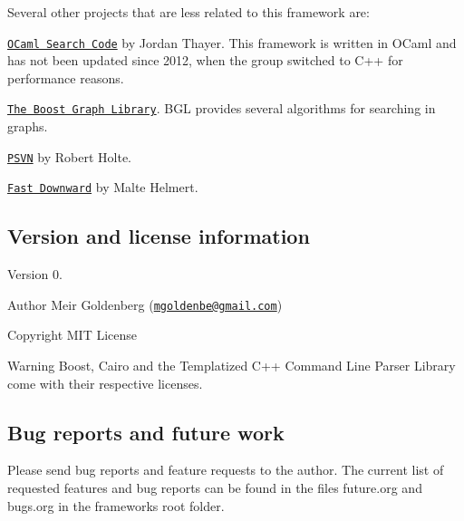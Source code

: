 Several other projects that are less related to this framework are\+:
\begin{DoxyItemize}
\item \href{https://github.com/jordanthayer/ocaml-search}{\tt O\+Caml Search Code} by Jordan Thayer. This framework is written in {\ttfamily O\+Caml} and has not been updated since 2012, when the group switched to {\ttfamily C++} for performance reasons.
\item \href{http://www.boost.org/doc/libs/1_61_0/libs/graph/doc/}{\tt The Boost Graph Library}. {\ttfamily B\+GL} provides several algorithms for searching in graphs.
\item \href{https://era.library.ualberta.ca/downloads/7m01bn08g}{\tt P\+S\+VN} by Robert Holte.
\item \href{http://www.fast-downward.org/}{\tt Fast Downward} by Malte Helmert.
\end{DoxyItemize}\hypertarget{index_s-version}{}\subsection{Version and license information}\label{index_s-version}
\begin{DoxyVersion}{Version}
0. 
\end{DoxyVersion}
\begin{DoxyAuthor}{Author}
Meir Goldenberg (\href{mailto:mgoldenbe@gmail.com}{\tt mgoldenbe@gmail.\+com}) 
\end{DoxyAuthor}
\begin{DoxyCopyright}{Copyright}
M\+IT License 
\end{DoxyCopyright}
\begin{DoxyWarning}{Warning}
Boost, Cairo and the Templatized C++ Command Line Parser Library come with their respective licenses.
\end{DoxyWarning}
\hypertarget{index_s-future}{}\subsection{Bug reports and future work}\label{index_s-future}
Please send bug reports and feature requests to the author. The current list of requested features and bug reports can be found in the files {\ttfamily future.\+org} and {\ttfamily bugs.\+org} in the framework\textquotesingle{}s root folder. 